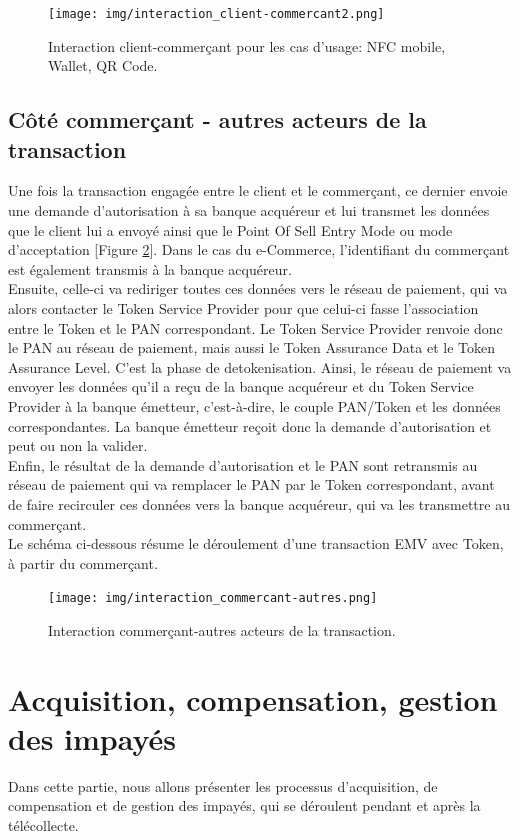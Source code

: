 \documentclass{report}
\begin{document}
\begin{figure}[!ht]
    \centering
			\texttt{[image: img/interaction\_client-commercant2.png]}
			\caption{\label{ClientCommercant} Interaction client-commerçant pour les cas d'usage: NFC mobile, Wallet, QR Code.}			
\end{figure}

\subsection{Côté commerçant - autres acteurs de la transaction}
Une fois la transaction engagée entre le client et le commerçant, ce dernier envoie une demande d'autorisation à sa banque acquéreur et lui transmet les données que le client lui a envoyé ainsi que le Point Of Sell Entry Mode ou mode d'acceptation [Figure \ref{CommercantAutresActeurs}]. Dans le cas du e-Commerce, l'identifiant du commerçant est également transmis à la banque acquéreur.\\
Ensuite, celle-ci va rediriger toutes ces données vers le réseau de paiement, qui va alors contacter le Token Service Provider pour que celui-ci fasse l'association entre le Token et le PAN correspondant. Le Token Service Provider renvoie donc le PAN au réseau de paiement, mais aussi le Token Assurance Data et le Token Assurance Level. C'est la phase de detokenisation. Ainsi, le réseau de paiement va envoyer les données qu'il a reçu de la banque acquéreur et du Token Service Provider à la banque émetteur, c'est-à-dire, le couple PAN/Token et les données correspondantes. La banque émetteur reçoit donc la demande d'autorisation et peut ou non la valider.\\
Enfin, le résultat de la demande d'autorisation et le PAN sont retransmis au réseau de paiement qui va remplacer le PAN par le Token correspondant, avant de faire recirculer ces données vers la banque acquéreur, qui va les transmettre au commerçant.\\

\noindent
Le schéma ci-dessous résume le déroulement d'une transaction EMV avec Token, à partir du commerçant.

\begin{figure}[!ht]
    \centering
			\texttt{[image: img/interaction\_commercant-autres.png]}
			\caption{\label{CommercantAutresActeurs} Interaction commerçant-autres acteurs de la transaction.}			
\end{figure}


\section{Acquisition, compensation, gestion des impayés}
Dans cette partie, nous allons présenter les processus d'acquisition, de compensation et de gestion des impayés, qui se déroulent pendant et après la télécollecte.\\
\end{document}
